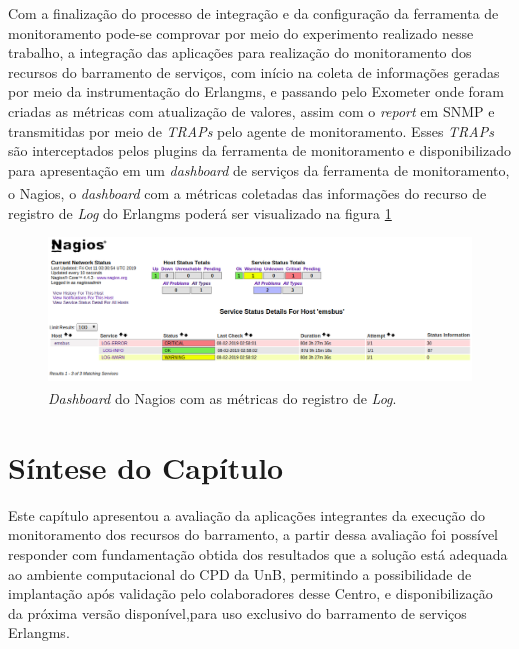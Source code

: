 Com a finalização do processo de integração e da configuração da ferramenta de monitoramento pode-se comprovar por meio do experimento realizado nesse trabalho, a integração das aplicações para realização do monitoramento dos recursos do barramento de serviços, com início na coleta de informações geradas por meio da instrumentação do Erlangms, e passando pelo Exometer onde foram criadas as métricas com atualização de valores, assim com o \textit{report} em \acrshort{SNMP} e transmitidas por meio de \textit{TRAPs} pelo agente de monitoramento. Esses \textit{TRAPs} são interceptados pelos plugins da ferramenta de monitoramento e disponibilizado para apresentação em um \textit{dashboard} de serviços da ferramenta de monitoramento, o Nagios\textsuperscript{\textregistered}, o \textit{dashboard} com a métricas coletadas das informações do recurso de registro de \textit{Log} do Erlangms poderá ser visualizado na figura \ref{fun:fig:nagiosDashbordEmsbus}

\begin{figure}[H]
    \centering
    \includegraphics[scale = 0.57]{img/nagiosConfigurado.png}
    \caption{\textit{Dashboard} do Nagios\textsuperscript{\textregistered} com as métricas do registro de \textit{Log}.}
    \label{fun:fig:nagiosDashbordEmsbus}
\end{figure}
 

\section{Síntese do Capítulo}
\label{sintese5}

Este capítulo apresentou a avaliação da aplicações integrantes da execução do monitoramento dos recursos do barramento, a partir dessa avaliação foi possível responder com fundamentação obtida dos resultados que a solução está adequada ao ambiente computacional do \acrshort{CPD} da \acrshort{UnB}, permitindo a possibilidade de implantação após validação pelo colaboradores desse Centro, e disponibilização da próxima versão disponível,para uso exclusivo do barramento de serviços Erlangms.